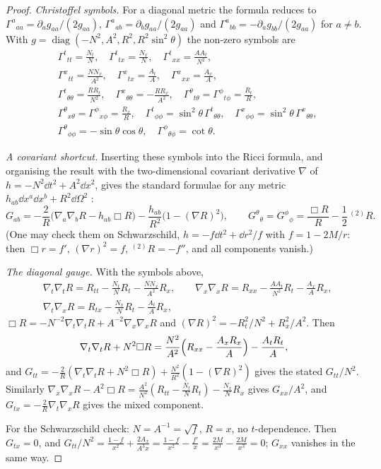 \begin{proof}
\emph{Christoffel symbols.} For a diagonal metric the formula reduces to $\Gamma^a{}_{aa}=\partial_ag_{aa}/(2g_{aa})$, $\Gamma^a{}_{ab}=\partial_bg_{aa}/(2g_{aa})$ and $\Gamma^a{}_{bb}=-\partial_ag_{bb}/(2g_{aa})$ for $a\ne b$. With $g=\operatorname{diag}(-N^2,A^2,R^2,R^2\sin^2\theta)$ the non-zero symbols are
\begin{align*}
&\Gamma^t{}_{tt}=\tfrac{N_t}N,\quad \Gamma^t{}_{tx}=\tfrac{N_x}N,\quad \Gamma^t{}_{xx}=\tfrac{AA_t}{N^2},\\
&\Gamma^x{}_{tt}=\tfrac{NN_x}{A^2},\quad \Gamma^x{}_{tx}=\tfrac{A_t}A,\quad \Gamma^x{}_{xx}=\tfrac{A_x}A,\\
&\Gamma^t{}_{\theta\theta}=\tfrac{RR_t}{N^2},\quad \Gamma^x{}_{\theta\theta}=-\tfrac{RR_x}{A^2},\quad \Gamma^\theta{}_{t\theta}=\Gamma^\phi{}_{t\phi}=\tfrac{R_t}R,\\
&\Gamma^\theta{}_{x\theta}=\Gamma^\phi{}_{x\phi}=\tfrac{R_x}R,\quad \Gamma^t{}_{\phi\phi}=\sin^2\theta\,\Gamma^t{}_{\theta\theta},\quad \Gamma^x{}_{\phi\phi}=\sin^2\theta\,\Gamma^x{}_{\theta\theta},\\
&\Gamma^\theta{}_{\phi\phi}=-\sin\theta\cos\theta,\quad \Gamma^\phi{}_{\theta\phi}=\cot\theta .
\end{align*}

\emph{A covariant shortcut.} Inserting these symbols into the Ricci formula, and organising the result with the two-dimensional covariant derivative $\nabla$ of $h=-N^2\dd t^2+A^2\dd x^2$, gives the standard formulae for any metric $h_{ab}\dd x^a\dd x^b+R^2\dd\Omega^2$ \cite{MTW}:
\[
G_{ab}=-\frac2R\bigl(\nabla_a\nabla_bR-h_{ab}\Box R\bigr)-\frac{h_{ab}}{R^2}\bigl(1-(\nabla R)^2\bigr),\qquad
G^\theta{}_\theta=G^\phi{}_\phi=\frac{\Box R}R-\frac12\,{}^{(2)}\!R .
\]
(One may check them on Schwarzschild, $h=-f\dd t^2+\dd r^2/f$ with $f=1-2M/r$: then $\Box r=f'$, $(\nabla r)^2=f$, ${}^{(2)}\!R=-f''$, and all components vanish.)

\emph{The diagonal gauge.} With the symbols above,
\[
\begin{aligned}
&\nabla_t\nabla_tR=R_{tt}-\tfrac{N_t}NR_t-\tfrac{NN_x}{A^2}R_x,\qquad \nabla_x\nabla_xR=R_{xx}-\tfrac{AA_t}{N^2}R_t-\tfrac{A_x}AR_x,\\
&\nabla_t\nabla_xR=R_{tx}-\tfrac{N_x}NR_t-\tfrac{A_t}AR_x,
\end{aligned}
\]
$\Box R=-N^{-2}\nabla_t\nabla_tR+A^{-2}\nabla_x\nabla_xR$ and $(\nabla R)^2=-R_t^2/N^2+R_x^2/A^2$. Then
\[
\nabla_t\nabla_tR+N^2\Box R=\frac{N^2}{A^2}\Bigl(R_{xx}-\frac{A_xR_x}A\Bigr)-\frac{A_tR_t}A,
\]
and $G_{tt}=-\frac2R(\nabla_t\nabla_tR+N^2\Box R)+\frac{N^2}{R^2}(1-(\nabla R)^2)$ gives the stated $G_{tt}/N^2$. Similarly $\nabla_x\nabla_xR-A^2\Box R=\frac{A^2}{N^2}(R_{tt}-\frac{N_t}NR_t)-\frac{N_x}NR_x$ gives $G_{xx}/A^2$, and $G_{tx}=-\frac2R\nabla_t\nabla_xR$ gives the mixed component.

For the Schwarzschild check: $N=A^{-1}=\sqrt f$, $R=x$, no $t$-dependence. Then $G_{tx}=0$, and $G_{tt}/N^2=\frac{1-f}{x^2}+\frac{2A_x}{A^3x}=\frac{1-f}{x^2}-\frac{f'}x=\frac{2M}{x^3}-\frac{2M}{x^3}=0$; $G_{xx}$ vanishes in the same way.
\end{proof}


